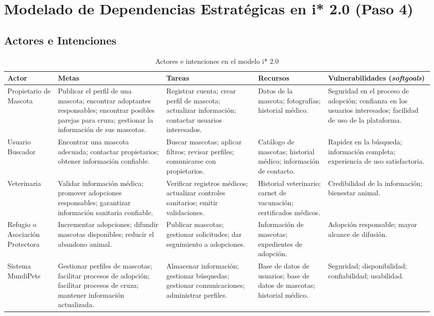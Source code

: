 \documentclass[journal,onecolumn]{IEEEtran}
\begin{document}
\section{Modelado de Dependencias Estratégicas en i* 2.0 (Paso 4)}

\subsection{Actores e Intenciones}

\begin{table}[H]
\caption{Actores e intenciones en el modelo i* 2.0}
\label{tab:actores_istar}
\begin{tabularx}{\textwidth}{|l|X|X|X|X|}
\hline
\textbf{Actor} & \textbf{Metas} & \textbf{Tareas} & \textbf{Recursos} & \textbf{Vulnerabilidades (\textit{softgoals})} \\
\hline
Propietario de Mascota &
Publicar el perfil de una mascota; encontrar adoptantes responsables;
encontrar posibles parejas para cruza; gestionar la información de sus
mascotas. &
Registrar cuenta; crear perfil de mascota; actualizar información;
contactar usuarios interesados. &
Datos de la mascota; fotografías; historial médico. &
Seguridad en el proceso de adopción; confianza en los usuarios
interesados; facilidad de uso de la plataforma. \\
\hline
Usuario Buscador &
Encontrar una mascota adecuada; contactar propietarios; obtener
información confiable. &
Buscar mascotas; aplicar filtros; revisar perfiles; comunicarse con
propietarios. &
Catálogo de mascotas; historial médico; información de contacto. &
Rapidez en la búsqueda; información completa; experiencia de uso
satisfactoria. \\
\hline
Veterinaria &
Validar información médica; promover adopciones responsables; garantizar
información sanitaria confiable. &
Verificar registros médicos; actualizar controles sanitarios; emitir
validaciones. &
Historial veterinario; carnet de vacunación; certificados médicos. &
Credibilidad de la información; bienestar animal. \\
\hline
Refugio o Asociación Protectora &
Incrementar adopciones; difundir mascotas disponibles; reducir el abandono
animal. &
Publicar mascotas; gestionar solicitudes; dar seguimiento a adopciones. &
Información de mascotas; expedientes de adopción. &
Adopción responsable; mayor alcance de difusión. \\
\hline
Sistema MundiPets &
Gestionar perfiles de mascotas; facilitar procesos de adopción; facilitar
procesos de cruza; mantener información actualizada. &
Almacenar información; gestionar búsquedas; gestionar comunicaciones;
administrar perfiles. &
Base de datos de usuarios; base de datos de mascotas; historial médico. &
Seguridad; disponibilidad; confiabilidad; usabilidad. \\
\hline
\end{tabularx}
\end{table}
\end{document}
